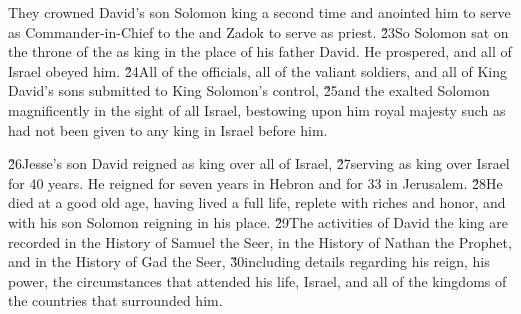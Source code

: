 They crowned David's son Solomon king a second time and anointed him to serve as Commander-in-Chief to the  and Zadok to serve as priest. \v{23}So Solomon sat on the throne of the  as king in the place of his father David. He prospered, and all of Israel obeyed him. \v{24}All of the officials, all of the valiant soldiers, and all of King David's sons submitted to King Solomon's control, \v{25}and the  exalted Solomon magnificently in the sight of all Israel, bestowing upon him royal majesty such as had not been given to any king in Israel before him.

\v{26}Jesse's son David reigned as king over all of Israel, \v{27}serving as king over Israel for 40 years. He reigned for seven years in Hebron and for 33 in Jerusalem. \v{28}He died at a good old age, having lived a full life, replete with riches and honor, and with his son Solomon reigning in his place. \v{29}The activities of David the king are recorded in the History of Samuel the Seer, in the History of Nathan the Prophet, and in the History of Gad the Seer, \v{30}including details regarding his reign, his power, the circumstances that attended his life, Israel, and all of the kingdoms of the countries that surrounded him.
